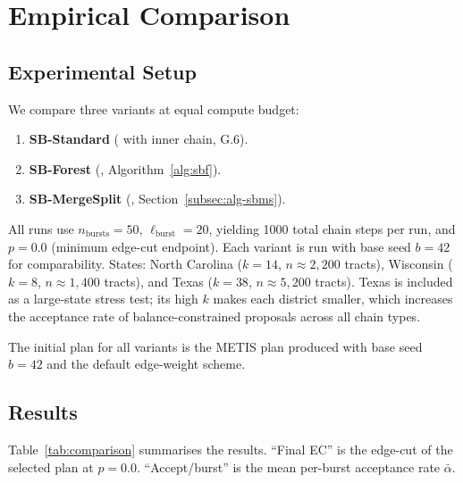 \section{Empirical Comparison}
\label{sec:comparison}

\subsection{Experimental Setup}

We compare three \sburst{} variants at equal compute budget:
\begin{enumerate}
  \item \textbf{SB-Standard} (\sburst{} with \recom{} inner chain, G.6).
  \item \textbf{SB-Forest} (\sbf{}, Algorithm~\ref{alg:sbf}).
  \item \textbf{SB-MergeSplit} (\sbms{}, Section~\ref{subsec:alg-sbms}).
\end{enumerate}

All runs use $n_{\mathrm{bursts}} = 50$, $\ell_{\mathrm{burst}} = 20$,
yielding 1000 total chain steps per run, and $p = 0.0$ (minimum edge-cut
endpoint).
Each variant is run with base seed $b = 42$ for comparability.
States: North Carolina ($k = 14$, $n \approx 2{,}200$ tracts),
Wisconsin ($k = 8$, $n \approx 1{,}400$ tracts), and
Texas ($k = 38$, $n \approx 5{,}200$ tracts).
Texas is included as a large-state stress test; its high $k$ makes each
district smaller, which increases the acceptance rate of balance-constrained
proposals across all chain types.

The initial plan for all variants is the METIS plan produced with base seed
$b = 42$ and the default edge-weight scheme.

\subsection{Results}

Table~\ref{tab:comparison} summarises the results.
``Final EC'' is the edge-cut of the selected plan at $p = 0.0$.
``Accept/burst'' is the mean per-burst acceptance rate $\bar\alpha$.

